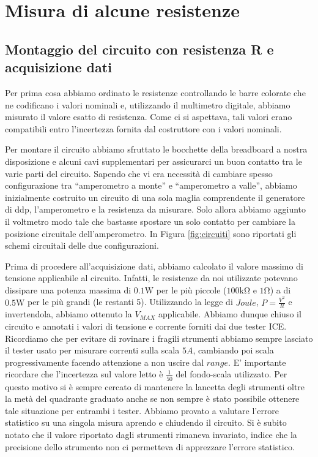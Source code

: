 \section{Misura di alcune resistenze}
\subsection{Montaggio del circuito con resistenza R e acquisizione dati}
Per prima cosa abbiamo ordinato le resistenze controllando le barre colorate che ne codificano  i valori nominali e, utilizzando il multimetro digitale, abbiamo misurato il valore esatto di resistenza. Come ci si aspettava, tali valori erano compatibili entro l'incertezza fornita dal costruttore con i valori nominali.

Per montare il circuito abbiamo sfruttato le bocchette della breadboard a nostra disposizione e alcuni cavi supplementari per assicurarci un buon contatto tra le varie parti del circuito.
Sapendo che vi era necessità di cambiare spesso configurazione tra ``amperometro a monte'' e ``amperometro a valle'', abbiamo inizialmente costruito un circuito di una sola maglia comprendente il generatore di ddp, l'amperometro e la resistenza da misurare. 
Solo allora abbiamo aggiunto il voltmetro modo tale che bastasse spostare un solo contatto per cambiare la posizione circuitale dell'amperometro. In Figura \ref{fig:circuiti} sono riportati gli schemi circuitali delle due configurazioni.

Prima di procedere all'acquisizione dati, abbiamo calcolato il valore massimo di tensione applicabile al circuito. Infatti, le resistenze da noi utilizzate potevano dissipare una potenza massima di $0.1\si{\watt}$ per le più piccole ($100 \si{\kilo\ohm}$ e $1\si{\ohm}$) a di $0.5\si{\watt}$ per le più grandi (le restanti 5). Utilizzando la legge di $Joule$, $P=\frac{V^2}{R}$ e invertendola, abbiamo ottenuto la $V_{MAX}$ applicabile. %
Abbiamo dunque chiuso il circuito e annotati i valori di tensione e corrente forniti dai due tester ICE. Ricordiamo che per evitare di rovinare i fragili strumenti abbiamo sempre lasciato il tester usato per misurare correnti sulla scala $5A$, cambiando poi scala progressivamente facendo attenzione a non uscire dal $range$. E' importante ricordare che l'incertezza sul valore letto è $\frac{1}{50}$ del fondo-scala utilizzato. Per questo motivo si è sempre cercato di mantenere la lancetta degli strumenti oltre la metà del quadrante graduato anche se non sempre è stato possibile ottenere tale situazione per entrambi i tester.
 Abbiamo provato a valutare l'errore statistico su una singola misura aprendo e chiudendo il circuito. Si è subito notato che il valore riportato dagli strumenti rimaneva invariato, indice che la precisione dello strumento non ci permetteva di apprezzare l'errore statistico.

